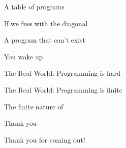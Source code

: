 \documentclass[presentation]{beamer}
\begin{document}
\begin{frame}[label={sec:orga059993}]{A table of programs}
\end{frame}
\begin{frame}[label={sec:org31e98b8}]{If we fuss with the diagonal}
\end{frame}
\begin{frame}[label={sec:orgd75fb14}]{A program that can't exist}
\end{frame}
\begin{frame}[label={sec:org2489ca5}]{You wake up}
\end{frame}
\begin{frame}[label={sec:org75bb20e}]{The Real World: Programming is \alert{hard}}
\end{frame}
\begin{frame}[label={sec:org88b31cc}]{The Real World: Programming is \alert{finite}}
\begin{block}{The finite nature of}
\end{block}
\end{frame}
\begin{frame}[label={sec:org1c34829}]{Thank you}
\begin{block}{}
{\Huge
Thank you for coming out!
}
\end{block}
\end{frame}
\end{document}

